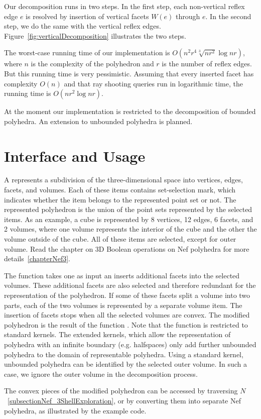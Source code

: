Our decomposition runs in two steps. In the first step, each
non-vertical reflex edge $e$ is resolved by insertion of vertical
facets $W(e)$ through $e$. In the second step, we do the same with the
vertical reflex edges. Figure~\ref{fig:verticalDecomposition}
illustrates the two steps.

The worst-case running time of our implementation is
$O(n^2r^4\sqrt[3]{nr^2}\log{nr})$, where $n$ is the complexity of the
polyhedron and $r$ is the number of reflex edges. But this running
time is very pessimistic. Assuming that every inserted facet has
complexity $O(n)$ and that ray shooting queries run in logarithmic
time, the running time is $O(nr^2\log{nr})$.

At the moment our implementation is restricted to the decomposition of
bounded polyhedra. An extension to unbounded polyhedra is planned.

\section{Interface and Usage}

A  represents a subdivision of the
three-dimensional space into vertices, edges, facets, and
volumes. Each of these items contains set-selection mark, which
indicates whether the item belongs to the represented point set or
not. The represented polyhedron is the union of the point sets
represented by the selected items. As an example, a cube is
represented by 8 vertices, 12 edges, 6 facets, and 2 volumes, where
one volume represents the interior of the cube and the other the
volume outside of the cube. All of these items are selected, except
for outer volume.  Read the chapter on 3D Boolean operations on Nef
polyhedra for more details~\ref{chapterNef3}.

The function  takes one
 as input an inserts additional facets into the
selected volumes. These additional facets are also selected and
therefore redundant for the representation of the polyhedron. If some
of these facets split a volume into two parts, each of the two volumes
is represented by a separate volume item. The insertion of facets
stops when all the selected volumes are convex. The modified
polyhedron is the result of the function
. Note that the function 
 is restricted to standard kernels. 
The extended kernels, which allow the representation of polyhedra with
an infinite boundary (e.g. halfspaces) only add further unbounded
polyhedra to the domain of representable polyhedra. Using a standard
kernel, unbounded polyhedra can be identified by the selected outer
volume. In such a case, we ignore the outer volume in the
decomposition process.

The convex pieces of the modified polyhedron can be accessed by
traversing $N$~\ref{subsectionNef_3ShellExploration}, or by converting
them into separate Nef polyhedra, as illustrated by the example code.

